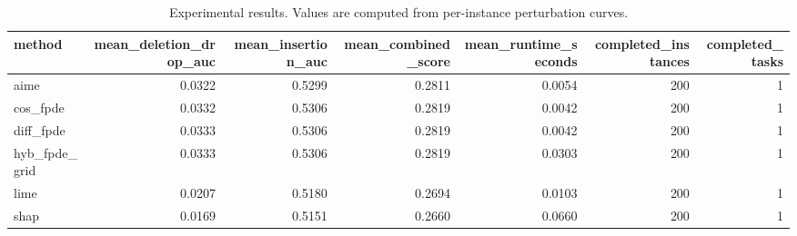 \begin{table}[t]
\caption{Experimental results. Values are computed from per-instance perturbation curves.}
\label{tab:main_results_computed}
\centering
\begin{tabular}{lrrrrrr}
\toprule
method & mean\_deletion\_drop\_auc & mean\_insertion\_auc & mean\_combined\_score & mean\_runtime\_seconds & completed\_instances & completed\_tasks \\
\midrule
aime & 0.0322 & 0.5299 & 0.2811 & 0.0054 & 200 & 1 \\
cos\_fpde & 0.0332 & 0.5306 & 0.2819 & 0.0042 & 200 & 1 \\
diff\_fpde & 0.0333 & 0.5306 & 0.2819 & 0.0042 & 200 & 1 \\
hyb\_fpde\_grid & 0.0333 & 0.5306 & 0.2819 & 0.0303 & 200 & 1 \\
lime & 0.0207 & 0.5180 & 0.2694 & 0.0103 & 200 & 1 \\
shap & 0.0169 & 0.5151 & 0.2660 & 0.0660 & 200 & 1 \\
\bottomrule
\end{tabular}

\end{table}
